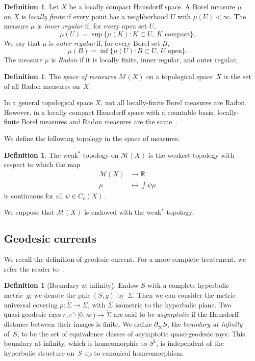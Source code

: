 \documentclass[11pt]{amsart}
\numberwithin{equation}{section}
\numberwithin{figure}{section}
\theoremstyle{definition}
\newtheorem{definition}[theorem]{Definition}
\theoremstyle{plain}
\newcommand*{\wt}[1]{\widetilde{#1}}
\begin{document}
\begin{definition}
Let $X$ be a locally compact Hausdorff space. A Borel measure $\mu$ on $X$ is \emph{locally finite} if every point has a neighborhood $U$ with $\mu(U)< \infty$.
The measure $\mu$ is \emph{inner regular} if, for every open set $U$,
\[
  \mu(U) = \sup \{ \mu(K) : K \subset U,\ \text{$K$ compact} \}.
\]
We say that $\mu$ is \emph{outer regular} if, for every Borel set $B$,
\[
  \mu(B) = \inf \{ \mu(U) : B \subset U,\ \text{$U$ open} \}.
\]
The measure $\mu$ is \emph{Radon} if it is locally finite, inner regular, and outer regular.
\label{def:radon}
\end{definition}

\begin{definition}
  The \emph{space of measures $\mathcal{M}(X)$} on a topological
  space~$X$ is the set of all Radon measures on~$X$.
\end{definition}

In a general topological space $X$, not all locally-finite Borel
measures are Radon. However, in a locally compact Hausdorff space with
a countable basis, locally-finite Borel measures and Radon measures
are the same~\cite[Theorem~29.12]{Bau01:Measure}.

We define the following topology in the space of measures.

\begin{definition} The weak$^*$-topology on $\mathcal{M}(X)$ is the weakest topology with respect to which the map
\begin{align*}
  \mathcal{M}(X) &\to \mathbb{R}\\
  \mu &\mapsto \int \psi \mu
\end{align*}
is continuous for all $\psi \in C_c(X)$.
\end{definition}

We suppose that $\mathcal{M}(X)$ is endowed with the weak$^*$-topology.

\subsection{Geodesic currents}
\label{sec:currents}
We recall the definition of geodesic current. For a more complete
treatement, we refer the reader
to~\cite[Chapter~3]{ES22:GeodesicCount}.

\begin{definition}[Boundary at infinity]
\label{def:boundaryinfty}
Endow $S$ with a complete
hyperbolic  metric~$g$; we denote the pair $(S,g)$ by~$\Sigma$. Then
we can consider the metric
universal covering $p \colon \wt{\Sigma} \to \Sigma$, with
$\wt{\Sigma}$ isometric to the hyperbolic plane.
Two quasi-geodesic rays $c,c' \colon [0,\infty) \to \wt{\Sigma}$ are
said to be \emph{asymptotic} if the Hausdorff distance between their images is finite.
We define
$\partial_{\infty} S$, the \emph{boundary at infinity}
of~$S$, to be the set of equivalence classes of
asymptotic quasi-geodesic rays. This boundary at infinity, which is homeomorphic to $S^1$, is
independent of the hyperbolic structure on~$S$ up to canonical
homeomorphism.
\end{definition}
\end{document}
